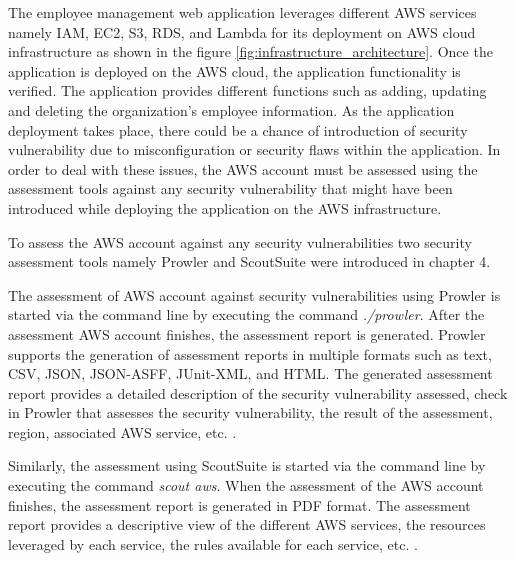 \par The employee management web application \cite{78}
leverages different AWS services namely IAM, EC2, S3, RDS, and Lambda for its deployment on AWS cloud infrastructure as shown in the figure \ref{fig:infrastructure_architecture}.
Once the application is deployed on the AWS cloud, the application functionality is verified.
The application provides different functions such as adding, updating and deleting the organization’s employee information.
As the application deployment takes place, there could be a chance of introduction of security vulnerability due to misconfiguration or security flaws within the application.
In order to deal with these issues, the AWS account must be assessed using the assessment tools against any security vulnerability that might have been introduced while deploying the application on the AWS infrastructure.

\par To assess the AWS account against any security vulnerabilities two security assessment tools namely Prowler and ScoutSuite were introduced in chapter 4.

\par The assessment of AWS account against security vulnerabilities using Prowler is started via the command line by executing the command \textit{./prowler}.
After the assessment AWS account finishes, the assessment report is generated.
Prowler supports the generation of assessment reports in
multiple formats such as text, CSV, JSON, JSON-ASFF, JUnit-XML, and HTML. The generated assessment report provides a detailed description of the security vulnerability assessed, check in Prowler that assesses the security vulnerability, the result of the assessment, region, associated AWS service, etc. \cite{49}.


\par Similarly, the assessment using ScoutSuite is
started via the command line by executing the command
\textit{scout aws}.
When the assessment
of the AWS account finishes, the assessment report is generated in PDF format.
The assessment report provides a descriptive view of the 
different AWS services, the resources leveraged by each 
service, the rules available for each service, etc.
\cite{88}.


